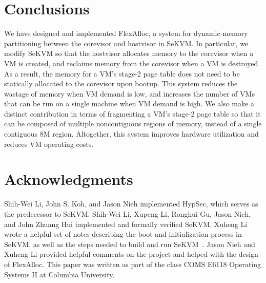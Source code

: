 \section{Conclusions}

We have designed and implemented FlexAlloc, a system for dynamic memory
partitioning between the corevisor and hostvisor in SeKVM. In particular, we
modify SeKVM so that the hostvisor allocates memory to the corevisor when a VM is
created, and reclaims memory from the corevisor when a VM is destroyed. As a
result, the memory for a VM's stage-2 page table does not need to be statically
allocated to the corevisor upon bootup. This system reduces the wastage of memory
when VM demand is low, and increases the number of VMs that can be run
on a single machine when VM demand is high. We also make a distinct contribution in terms of fragmenting
a VM's stage-2 page table so that it can be composed of multiple noncontiguous
regions of memory, instead of a single contiguous 8M region. Altogether, this
system improves hardware utilization and reduces VM operating costs.

\section*{Acknowledgments}

Shih-Wei Li, John S. Koh, and Jason Nieh implemented HypSec, which serves as
the predecessor to SeKVM. Shih-Wei Li, Xupeng Li, Ronghui Gu, Jason Nieh, and
John Zhuang Hui implemented and formally verified SeKVM. Xuheng Li wrote a
helpful set of notes describing the boot and initialization process in SeKVM,
as well as the steps needed to build and run SeKVM~\cite{xuheng}. Jason Nieh and
Xuheng Li provided helpful comments on the project and helped with the design
of FlexAlloc. This paper was written as part of the class COMS E6118 Operating
Systems II at Columbia University.





